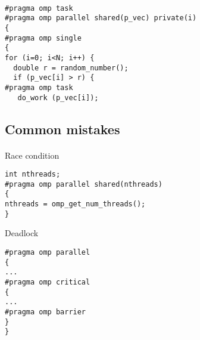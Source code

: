 \paragraph{}











\begin{verbatim}
#pragma omp task 
#pragma omp parallel shared(p_vec) private(i)
{
#pragma omp single
{
for (i=0; i<N; i++) {
  double r = random_number();
  if (p_vec[i] > r) {
#pragma omp task
   do_work (p_vec[i]);

\end{verbatim}



\subsection*{Common mistakes}

\paragraph{}
Race condition






\begin{verbatim}
int nthreads;
#pragma omp parallel shared(nthreads)
{
nthreads = omp_get_num_threads();
}

\end{verbatim}

Deadlock










\begin{verbatim}
#pragma omp parallel
{
...
#pragma omp critical
{
...
#pragma omp barrier
}
}

\end{verbatim}



